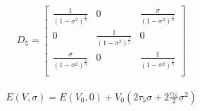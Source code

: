 \begin{center}
\begin{minipage}{.35\textwidth}
  \begin{equation}
    \begin{split}
      D_{5} = 
      \begin{bmatrix}
      \frac{1}{(1-\sigma^2)^{\frac{1}{3}}} & 0           & \frac{\sigma}{(1-\sigma^2)^{\frac{1}{3}}}              \\
      0                                    & \frac{1}{(1-\sigma^2)^{\frac{1}{3}}}      &   0  \\
      \frac{\sigma}{(1-\sigma^2)^{\frac{1}{3}}}   &   0  & \frac{1}{(1-\sigma^2)^{\frac{1}{3}}}       \\
      \end{bmatrix}
    \label{eq:distortion5}
    \end{split}
  \end{equation}
\end{minipage}
\begin{minipage}{.10\textwidth}
\end{minipage}
\begin{minipage}{.54\textwidth}
  \begin{equation}
    \begin{split}
    E(V,\sigma) = E(V_{0},0) + V_{0} \left(2 \tau_{5} \sigma + 2 \frac{c_{55}}{2} \sigma^2 \right)
    \end{split}
  \label{eq:distortion5energy}
  \end{equation}
\end{minipage}
\end{center}


